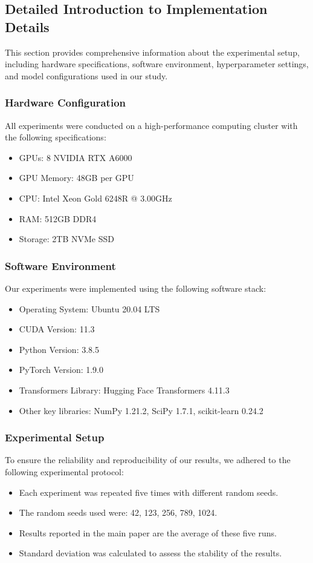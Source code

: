 \subsection{Detailed Introduction to Implementation Details}
This section provides comprehensive information about the experimental setup, including hardware specifications, software environment, hyperparameter settings, and model configurations used in our study.

\subsubsection{Hardware Configuration}
All experiments were conducted on a high-performance computing cluster with the following specifications:
\begin{itemize}[leftmargin=*]
    \item GPUs: 8 NVIDIA RTX A6000
    \item GPU Memory: 48GB per GPU
    \item CPU: Intel Xeon Gold 6248R @ 3.00GHz
    \item RAM: 512GB DDR4
    \item Storage: 2TB NVMe SSD
\end{itemize}

\subsubsection{Software Environment}
Our experiments were implemented using the following software stack:
\begin{itemize}[leftmargin=*]
    \item Operating System: Ubuntu 20.04 LTS
    \item CUDA Version: 11.3
    \item Python Version: 3.8.5
    \item PyTorch Version: 1.9.0
    \item Transformers Library: Hugging Face Transformers 4.11.3
    \item Other key libraries: NumPy 1.21.2, SciPy 1.7.1, scikit-learn 0.24.2
\end{itemize}

\subsubsection{Experimental Setup}
To ensure the reliability and reproducibility of our results, we adhered to the following experimental protocol:
\begin{itemize}[leftmargin=*]
    \item Each experiment was repeated five times with different random seeds.
    \item The random seeds used were: 42, 123, 256, 789, 1024.
    \item Results reported in the main paper are the average of these five runs.
    \item Standard deviation was calculated to assess the stability of the results.
\end{itemize}

